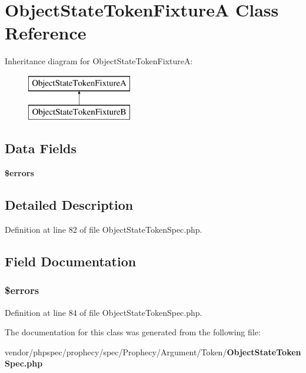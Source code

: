 \section{Object\+State\+Token\+Fixture\+A Class Reference}
\label{classspec_1_1_prophecy_1_1_argument_1_1_token_1_1_object_state_token_fixture_a}
Inheritance diagram for Object\+State\+Token\+Fixture\+A\+:\begin{figure}[H]
\begin{center}
\leavevmode
\includegraphics[height=2.000000cm]{classspec_1_1_prophecy_1_1_argument_1_1_token_1_1_object_state_token_fixture_a}
\end{center}
\end{figure}
\subsection*{Data Fields}
\begin{DoxyCompactItemize}
\item 
{\bf \$errors}
\end{DoxyCompactItemize}


\subsection{Detailed Description}


Definition at line 82 of file Object\+State\+Token\+Spec.\+php.



\subsection{Field Documentation}
\subsubsection[{\$errors}]{\setlength{\rightskip}{0pt plus 5cm}\$errors}\label{classspec_1_1_prophecy_1_1_argument_1_1_token_1_1_object_state_token_fixture_a_ab24faf4aa647cdcee494fc48524ad4ff}


Definition at line 84 of file Object\+State\+Token\+Spec.\+php.



The documentation for this class was generated from the following file\+:\begin{DoxyCompactItemize}
\item 
vendor/phpspec/prophecy/spec/\+Prophecy/\+Argument/\+Token/{\bf Object\+State\+Token\+Spec.\+php}\end{DoxyCompactItemize}
